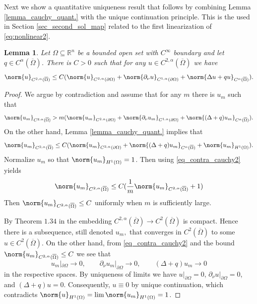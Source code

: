 \documentclass[11pt,a4paper]{amsart}
\newtheorem{Lemma}[Theorem]{Lemma}
\theoremstyle{definition}
\numberwithin{equation}{section}
\newcommand{\mR}{\mathbb{R}}                    %
\newcommand{\ol}[1]{\overline{#1}}
\newcommand{\p}{\partial}
\newcommand{\Om}{\Omega}
\begin{document}
Next we show a quantitative uniqueness result that follows by combining Lemma \ref{lemma_cauchy_quant.} with the unique continuation principle. This is the used in Section \ref{sec_second_sol_map} related to the first linearization of \eqref{eq:nonlinear2}.

\begin{Lemma} \label{lemma_cauchy_quantitative}
Let $\Omega\subseteq\mR^{n}$ be a bounded open set with $C^{\infty}$ boundary and let $q \in C^{\alpha}(\ol{\Om})$. There is $C > 0$ such that for any $u \in C^{2,\alpha}(\ol{\Om})$ we have 
\[
    \norm{u}_{C^{2,\alpha}(\ol{\Om})} \leq C (\norm{u}_{C^{2,\alpha}(\p \Om)} + \norm{\p_{\nu} u}_{C^{1,\alpha}(\p \Om)} + \norm{\Delta u + qu}_{C^{\alpha}(\ol{\Om})}).
\]
\end{Lemma}
\begin{proof}
We argue by contradiction and assume that for any $m$ there is $u_m$ such that 
\begin{equation} \label{eq_contra_cauchy2}
    \norm{u_m}_{C^{2,\alpha}(\ol{\Om})} > m (\norm{u_m}_{C^{2,\alpha}(\p \Om)} + \norm{\p_{\nu} u_m}_{C^{1,\alpha}(\p \Om)} + \norm{(\Delta+q)u_m}_{C^{\alpha}(\ol{\Om})}).
\end{equation}
On the other hand, Lemma \ref{lemma_cauchy_quant.} implies that 
\[
\norm{u_m}_{C^{2,\alpha}(\ol{\Om})} \leq C (\norm{u_m}_{C^{2,\alpha}(\p \Om)} + \norm{(\Delta+q)u_m}_{C^{\alpha}(\ol{\Om})} + \norm{u_m}_{H^1(\Om)}).
\]
Normalize $u_m$ so that $\norm{u_m}_{H^1(\Om)} = 1$. Then using \eqref{eq_contra_cauchy2} yields 
\begin{align*}
    \norm{u_m}_{C^{2,\alpha}(\ol{\Om})} \leq C(\frac{1}{m}\norm{u_m}_{C^{2,\alpha}(\ol{\Om})} + 1)
\end{align*}
Then $\norm{u_m}_{C^{2,\alpha}(\ol{\Om})} \leq C$ uniformly when $m$ is sufficiently large.

By Theorem $1.34$ in \cite{af03} the embedding $C^{2,\alpha}(\ol{\Om})\to C^{2}(\ol{\Om})$ is compact. Hence there is a subsequence, still denoted $u_m,$ that converges in $C^2(\ol{\Om})$ to some $u\in C^2(\ol{\Om}).$ On the other hand, from \eqref{eq_contra_cauchy2} and the bound $\norm{u_m}_{C^{2,\alpha}(\ol{\Om})} \leq C$ we see that 
\[
u_m|_{\p \Om} \to 0, \qquad \p_{\nu} u_m|_{\p \Om} \to 0, \qquad (\Delta+q)u_m \to 0
\]
in the respective spaces. By uniqueness of limits we have 
 $u|_{\p \Omega} = 0$, $\p_{\nu} u|_{\p \Om} = 0$, and $(\Delta+q)u=0$. Consequently, $u \equiv 0$ by unique continuation, which contradicts $\norm{u}_{H^1(\Om)} = \lim \norm{u_m}_{H^1(\Om)} = 1$.
\end{proof}
\end{document}
